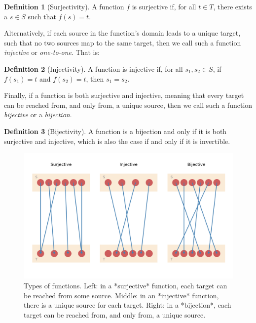 \documentclass[
]{book}
\theoremstyle{definition}
\newtheorem{definition}{Definition}[chapter]
\theoremstyle{definition}
\theoremstyle{definition}
\theoremstyle{definition}
\theoremstyle{remark}
\begin{document}
\begin{definition}[Surjectivity]
A function \(f\) is surjective if, for all \(t \in T\), there exists a \(s \in S\) such that \(f(s) = t\).
\end{definition}

Alternatively, if each source in the function's domain leads to a unique target, such that no two sources map to the same target, then we call such a function \emph{injective} or \emph{one-to-one}. That is:

\begin{definition}[Injectivity]
A function is injective if, for all \(s_1, s_2 \in S\), if \(f(s_1) = t\) and \(f(s_2) = t\), then \(s_1 = s_2\).
\end{definition}

Finally, if a function is both surjective and injective, meaning that every target can be reached from, and only from, a unique source, then we call such a function \emph{bijective} or a \emph{bijection}.

\begin{definition}[Bijectivity]
A function is a bijection and only if it is both surjective and injective, which is also the case if and only if it is invertible.
\end{definition}

\begin{figure}

{\centering \includegraphics[width=1\linewidth,height=1\textheight]{./figures/functions-types} 

}

\caption{Types of functions. Left: in a *surjective* function, each target can be reached from some source. Middle: in an *injective* function, there is a unique source for each target. Right: in a *bijection*, each target can be reached from, and only from, a unique source.}\label{fig:function-types}
\end{figure}
\end{document}

